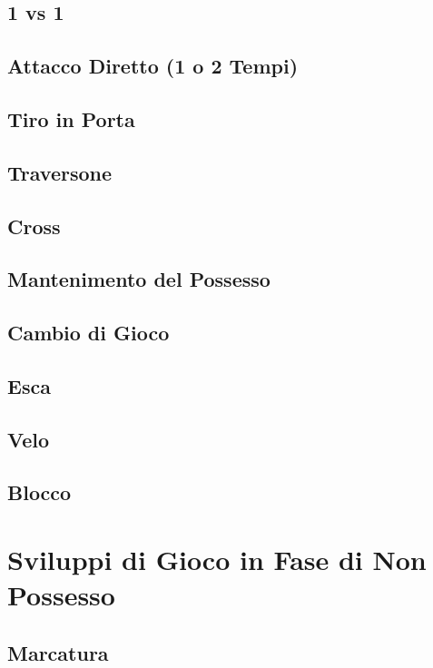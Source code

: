 \documentclass[../uefaC.tex]{subfiles}
\begin{document}
\subsection{1 vs 1}

\subsection{Attacco Diretto (1 o 2 Tempi)}

\subsection{Tiro in Porta}

\subsection{Traversone}

\subsection{Cross}

\subsection{Mantenimento del Possesso}

\subsection{Cambio di Gioco}

\subsection{Esca}

\subsection{Velo}

\subsection{Blocco}

\section{Sviluppi di Gioco in Fase di Non Possesso}

\subsection{Marcatura}
\end{document}
